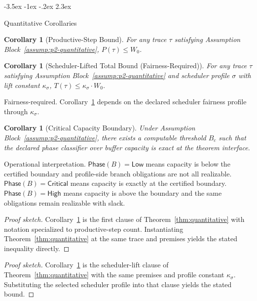\documentclass[a4paper,10pt,twocolumn,english]{article}
\makeatletter
\renewcommand{\section}{\@startsection{section}{1}{\z@}%
  {-3.5ex \@plus -1ex \@minus -.2ex}%
  {2.3ex}%
  {\raggedright\normalfont\large\bfseries}}
\numberwithin{equation}{section}
\theoremstyle{paperdef}
\theoremstyle{paperplain}
\newtheorem{corollary}[definition]{Corollary}
\theoremstyle{paperdef}
\theoremstyle{paperremark}
\newcommand{\Bc}{\ensuremath{B_c}}
\newcommand{\Phase}{\ensuremath{\mathsf{Phase}}}
\makeatother
\begin{document}
\section{Quantitative Corollaries}
\label{sec:corollaries}

\begin{corollary}[Productive-Step Bound]
	\label{cor:productive}
	For any trace $\tau$ satisfying Assumption Block~\ref{assump:p2-quantitative}, $P(\tau) \le W_0$.
\end{corollary}

\begin{corollary}[Scheduler-Lifted Total Bound (Fairness-Required)]
	\label{cor:scheduler}
	For any trace $\tau$ satisfying Assumption Block~\ref{assump:p2-quantitative} and scheduler profile $\sigma$ with lift constant $\kappa_\sigma$, $T(\tau) \le \kappa_\sigma \cdot W_0$.
\end{corollary}

Fairness-required. Corollary~\ref{cor:scheduler} depends on the declared
scheduler fairness profile through $\kappa_\sigma$.

\begin{corollary}[Critical Capacity Boundary]
	\label{cor:capacity}
	Under Assumption Block~\ref{assump:p2-quantitative}, there exists a computable threshold $\Bc$ such that the declared phase classifier over buffer capacity is exact at the theorem interface.
\end{corollary}

Operational interpretation. $\Phase(B)=\mathsf{Low}$ means capacity is below the certified boundary and profile-side branch obligations are not all realizable. $\Phase(B)=\mathsf{Critical}$ means capacity is exactly at the certified boundary. $\Phase(B)=\mathsf{High}$ means capacity is above the boundary and the same obligations remain realizable with slack.

\begin{proof}[Proof sketch]
	Corollary~\ref{cor:productive} is the first clause of Theorem~\ref{thm:quantitative} with notation specialized to productive-step count. Instantiating Theorem~\ref{thm:quantitative} at the same trace and premises yields the stated inequality directly.
\end{proof}

\begin{proof}[Proof sketch]
	Corollary~\ref{cor:scheduler} is the scheduler-lift clause of Theorem~\ref{thm:quantitative} with the same premises and profile constant $\kappa_\sigma$. Substituting the selected scheduler profile into that clause yields the stated bound.
\end{proof}
\end{document}
